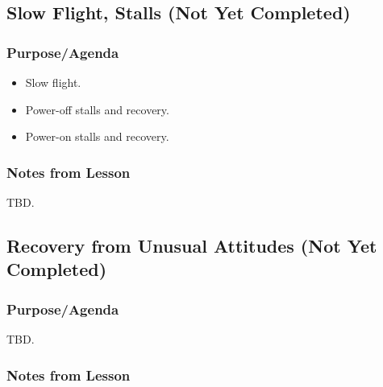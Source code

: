 \documentclass[letterpaper,10pt,titlepage]{article}
\begin{document}
\subsection{Slow Flight, Stalls (Not Yet Completed)}
\label{sfle0:ssfs0}



\subsubsection{Purpose/Agenda}
\label{sfle0:ssfs0:spov0}

\begin{itemize}
\item Slow flight.
\item Power-off stalls and recovery.
\item Power-on stalls and recovery.
\end{itemize}


\subsubsection{Notes from Lesson}
\label{sfle0:ssfs0:snff0}

TBD.



\subsection{Recovery from Unusual Attitudes (Not Yet Completed)}
\label{sfle0:srua0}



\subsubsection{Purpose/Agenda}
\label{sfle0:srua0:spov0}

TBD.


\subsubsection{Notes from Lesson}
\label{sfle0:srua0:snff0}
\end{document}
